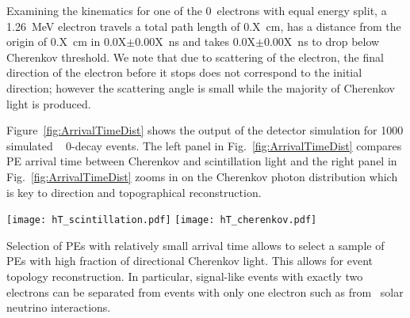 Examining the kinematics for one of the 0\nbb~electrons with equal energy split, a 1.26~MeV electron travels a total path length of 0.X~cm, 
has a distance from the origin of 0.X~cm in 0.0X$\pm$0.00X~ns  and takes 0.0X$\pm$0.00X~ns to drop below Cherenkov threshold. 
We note that due to scattering of the electron, the final direction of the electron before it stops does not correspond to the initial 
direction; however the scattering angle is small while the majority of Cherenkov light is produced.

Figure~\ref{fig:ArrivalTimeDist} shows the output of the detector simulation for 1000 simulated \Te~ 0\nbb-decay 
events. The left panel in Fig.~\ref{fig:ArrivalTimeDist} compares PE arrival time between Cherenkov and scintillation light  
and the right panel in Fig.~\ref{fig:ArrivalTimeDist} zooms in on the Cherenkov photon distribution which is key to direction and 
topographical reconstruction.


\begin{figure*}[ht]
  \centering
  \texttt{[image: hT\_scintillation.pdf]}
  \texttt{[image: hT\_cherenkov.pdf]}
  \caption{\emph{Left:} Photo-electron (PE) arrival times after
    application of the photo-detector transit time spread (TTS) of 100~ps for the default simulation 
    of \Te~0\nbb-decay and \C~events produced at the center of the detector. 
    Scintillation PE arrival time distribution is compared for \nbb-decay (dashed blue line) and
    \Cten~events (dotted green line). The corresponding distribution for \B~events is not shown
    because it is indistinguishable from the distribution for \nbb-decay. Cherenkov PE arrival
    times are shown for \nbb-decay (\emph{solid red line}) to demonstrate their contribution to the early PE sample.
    The vertical line at 33.5~ns indicates the time cut for the selection of the early PE sample.
    The shape of scintillation PE arrival times for \B~events
    \emph{Right:} Comparison between Cherenkov PEs arrival time for \Te~0\nbb-decay (\emph{solid line}), 
    \B~(\emph{dashed line}), and \C~events (\emph{dotted line}).}
\label{fig:ArrivalTimeDist}
\end{figure*}


Selection of PEs with relatively small arrival time allows to select a sample of PEs with high fraction of directional Cherenkov light.
This allows for event topology reconstruction. In particular, signal-like events with exactly two electrons can be separated from events 
with only one electron such as from \B~solar neutrino interactions.

